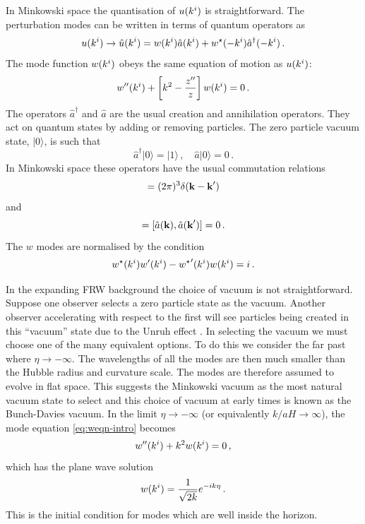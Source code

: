 In Minkowski space the quantisation of $u(k^i)$ is straightforward.
The perturbation modes can be written in terms of quantum operators as
% 
\begin{equation}
 u(k^i)\rightarrow\hat{u}(k^i) = 
  w(k^i) \hat{a}(k^i) + w^\star(-k^i)\hat{a}^\dagger(-k^i) \,.
\end{equation}
%
The mode function $w(k^i)$ obeys the same equation of motion as $u(k^i)$:
% 
\begin{equation}
\label{eq:weqn-intro}
 w''(k^i) + \left[ k^2 -\frac{z''}{z}\right]w(k^i) = 0\,.
\end{equation}
% 
The operators $\hat{a}^\dagger$ and $\hat{a}$ are the usual creation and
annihilation operators. They act on quantum states by adding or
removing particles. The zero particle vacuum state, $|0\rangle$, is such that
% 
\begin{equation}
 \hat{a}^\dagger|0\rangle = |1\rangle\,,\quad \hat{a}|0\rangle = 0\,.
\end{equation}
% 
In Minkowski space these operators have the usual commutation relations
% 
\begin{equation}
 [\hat{a}(\kb), \hat{a}^\dagger(\kb')] = (2\pi)^3 \delta(\kb -\kb') \\
\end{equation}
and
\begin{equation}
[\hat{a}^\dagger(\kb), \hat{a}^\dagger(\kb')] = [\hat{a}(\kb), \hat{a}(\kb')] = 0\,.
\end{equation}
% 
The $w$ modes are normalised by the condition \cite{Mukhanov:2005sc}
% 
\begin{equation}
\label{eq:quantcondition-intro}
 w^\star(k^i)w'(k^i) - {w^{\star}}'(k^i)w(k^i) = i\,.
\end{equation}


In the expanding FRW background the choice of vacuum is not straightforward.
Suppose one observer selects a zero particle state as the vacuum. Another
observer accelerating with respect to the first will see particles being
created in this ``vacuum'' state due to the Unruh effect
\cite{Kinney2009, Unruh1976a}. In selecting the vacuum we must choose one of the
many equivalent options.
To do this we consider the far past where $\eta\rightarrow -\infty$. The wavelengths of all the
modes are then much smaller than the Hubble radius and curvature scale. The modes are
therefore assumed to evolve in flat space. This suggests the Minkowski vacuum as the
most natural vacuum state to select and this choice of vacuum at
early times is known as the Bunch-Davies vacuum.
% 
In the limit $\eta\rightarrow -\infty$ (or equivalently $k/aH\rightarrow \infty$),
the mode equation
\eqref{eq:weqn-intro} becomes
% 
\begin{equation}
  w''(k^i) + k^2 w(k^i) = 0\,,
\end{equation}
% 
which has the plane wave solution
% 
\begin{equation}
\label{eq:subhsoln-intro}
 w(k^i) = \frac{1}{\sqrt{2k}} e^{-ik\eta}\,.
\end{equation}
% 
This is the initial condition for modes which are well inside the horizon.

